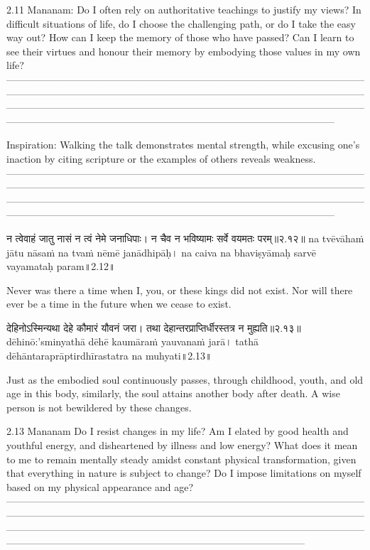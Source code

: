 2.11 Mananam:
Do I often rely on authoritative teachings to justify my views? In difficult situations of life, do I choose the challenging path, or do I take the easy way out? 
How can I keep the memory of those who have passed? Can I learn to see their virtues and honour their memory by embodying those  values in my own life? 
---------------------------------------------------------------------------------------------------------------------------------------------------------------------------------------------------------------------------------------------------------------------------------------------------------------------------------------------------------------------------------------------------------------------------------------

Inspiration:
Walking the talk demonstrates mental strength, while excusing one’s inaction by citing scripture or the examples of others reveals weakness.
—------------------------------------------------------------------------------------------------------------------------------------------------------------------------------------------------------------------------------------------------------------------------------------------------------------------------------------------------------------------------------------------------------------------------------------

न त्वेवाहं जातु नासं न त्वं नेमे जनाधिपाः।
 न चैव न भविष्यामः सर्वे वयमतः परम्॥२.१२॥
na tvēvāhaṁ jātu nāsaṁ na tvaṁ nēmē janādhipāḥ।
na caiva na bhaviṣyāmaḥ sarvē vayamataḥ param॥2.12॥

Never was there a time when I, you, or these kings did not exist. Nor will there ever be a time in the future when we cease to exist.


देहिनोऽस्मिन्यथा देहे कौमारं यौवनं जरा। 
तथा देहान्तरप्राप्तिर्धीरस्तत्र न मुह्यति॥२.१३॥
dēhinō:'sminyathā dēhē kaumāraṁ yauvanaṁ jarā। 
tathā dēhāntaraprāptirdhīrastatra na muhyati॥2.13॥

Just as the embodied soul continuously passes, through childhood, youth, and old age in this body, similarly, the soul attains another body after death. A wise person is not bewildered by these changes.

2.13 Mananam
Do I resist changes in my life? Am I elated by good health and youthful energy, and disheartened by illness and low energy? What does it mean to me to remain mentally steady amidst constant physical transformation, given that everything in nature is subject to change? Do I impose limitations on myself based on my physical appearance and age? 
—---------------------------------------------------------------------------------------------------------------------------------------------------------------------------------------------------------------------------------------------------------------------------------------------------------------------------------------------------------------------------------------------------------------------------

